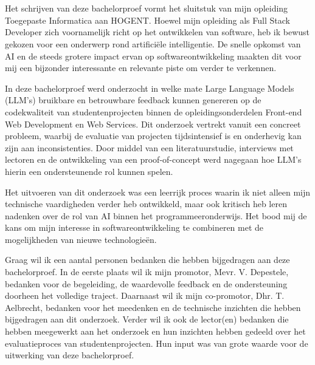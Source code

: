 
\chapter*{}
\label{ch:voorwoord}

Het schrijven van deze bachelorproef vormt het sluitstuk van mijn opleiding Toegepaste Informatica aan HOGENT. Hoewel mijn opleiding als Full Stack Developer zich voornamelijk richt op het ontwikkelen van software, heb ik bewust gekozen voor een onderwerp rond artificiële intelligentie. De snelle opkomst van AI en de steeds grotere impact ervan op softwareontwikkeling maakten dit voor mij een bijzonder interessante en relevante piste om verder te verkennen.

\vspace{1em}

In deze bachelorproef werd onderzocht in welke mate Large Language Models (LLM’s) bruikbare en betrouwbare feedback kunnen genereren op de codekwaliteit van studentenprojecten binnen de opleidingsonderdelen Front-end Web Development en Web Services. Dit onderzoek vertrekt vanuit een concreet probleem, waarbij de evaluatie van projecten tijdsintensief is en onderhevig kan zijn aan inconsistenties. Door middel van een literatuurstudie, interviews met lectoren en de ontwikkeling van een proof-of-concept werd nagegaan hoe LLM’s hierin een ondersteunende rol kunnen spelen.

\vspace{1em}

Het uitvoeren van dit onderzoek was een leerrijk proces waarin ik niet alleen mijn technische vaardigheden verder heb ontwikkeld, maar ook kritisch heb leren nadenken over de rol van AI binnen het programmeeronderwijs. Het bood mij de kans om mijn interesse in softwareontwikkeling te combineren met de mogelijkheden van nieuwe technologieën.

\vspace{1em}

Graag wil ik een aantal personen bedanken die hebben bijgedragen aan deze bachelorproef. In de eerste plaats wil ik mijn promotor, Mevr. V. Depestele, bedanken voor de begeleiding, de waardevolle feedback en de ondersteuning doorheen het volledige traject. Daarnaast wil ik mijn co-promotor, Dhr. T. Aelbrecht, bedanken voor het meedenken en de technische inzichten die hebben bijgedragen aan dit onderzoek. Verder wil ik ook de lector(en) bedanken die hebben meegewerkt aan het onderzoek en hun inzichten hebben gedeeld over het evaluatieproces van studentenprojecten. Hun input was van grote waarde voor de uitwerking van deze bachelorproef.

